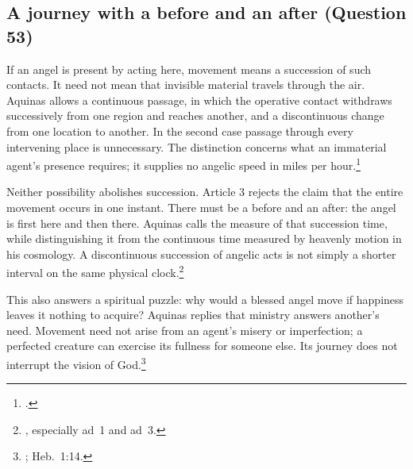 \subsection{A journey with a before and an after (Question 53)}

If an angel is present by acting here, movement means a succession of such contacts. It need not mean that invisible material travels through the air. Aquinas allows a continuous passage, in which the operative contact withdraws successively from one region and reaches another, and a discontinuous change from one location to another. In the second case passage through every intervening place is unnecessary. The distinction concerns what an immaterial agent's presence requires; it supplies no angelic speed in miles per hour.\footnote{.}

Neither possibility abolishes succession. Article 3 rejects the claim that the entire movement occurs in one instant. There must be a before and an after: the angel is first here and then there. Aquinas calls the measure of that succession time, while distinguishing it from the continuous time measured by heavenly motion in his cosmology. A discontinuous succession of angelic acts is not simply a shorter interval on the same physical clock.\footnote{, especially ad~1 and ad~3.}

This also answers a spiritual puzzle: why would a blessed angel move if happiness leaves it nothing to acquire? Aquinas replies that ministry answers another's need. Movement need not arise from an agent's misery or imperfection; a perfected creature can exercise its fullness for someone else. Its journey does not interrupt the vision of God.\footnote{; Heb.~1:14.}

